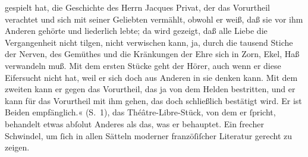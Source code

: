 \begin{ledgroupsized}[t]{13cm}
{{{                     gespielt hat, die Geschichte des Herrn Jacques Privat, der das Vorurtheil verachtet und sich
                     mit seiner Geliebten vermählt, obwohl er weiß, daß sie vor ihm Anderen gehörte
                     und liederlich lebte; da wird gezeigt, daß alle Liebe die Vergangenheit nicht
                     tilgen, nicht verwischen kann, ja, durch die tausend Stiche der Nerven, des
                     Gemüthes und die Kränkungen der Ehre sich in Zorn, Ekel, Haß verwandeln muß.
                     Mit dem ersten Stücke
                     geht der Hörer, auch wenn er diese Eifersucht nicht hat, weil er sich doch aus
                     Anderen in sie denken kann. Mit dem zweiten kann er gegen das Vorurtheil, das ja von dem
                     Helden bestritten, und er kann für das Vorurtheil mit ihm gehen, das doch
                     schließlich bestätigt wird. Er ist Beiden empfänglich.«
                     (S. 1)}}}\label{K_L02723-5h}, das Théâtre-Libre-Stück, von dem er ſpricht,
               behandelt etwas abſolut Anderes als das, was er behauptet. Ein frecher Schwindel, um
               ſich in allen Sätteln moderner \introOben{}franzöſiſcher\introOben{}
               Literatur gerecht zu zeigen.\pend
           \pstart

\end{ledgroupsized}
